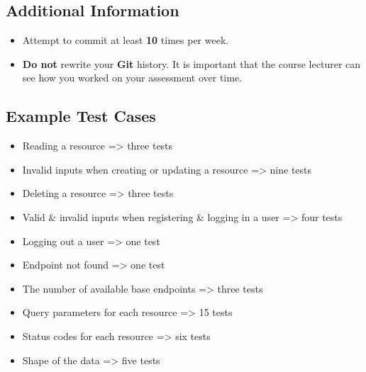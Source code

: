 \documentclass{article}
\begin{document}
\subsection*{Additional Information}
\begin{itemize}
    \item Attempt to commit at least \textbf{10} times per week.
    \item \textbf{Do not} rewrite your \textbf{Git} history. It is important that the course lecturer can see how you worked on your assessment over time. 
\end{itemize} 

\subsection*{Example Test Cases}
\begin{itemize}
  \item Reading a resource => three tests
  \item Invalid inputs when creating or updating a resource => nine tests
  \item Deleting a resource => three tests
  \item Valid \& invalid inputs when registering \& logging in a user => four tests
  \item Logging out a user => one test
  \item Endpoint not found => one test
  \item The number of available base endpoints => three tests
  \item Query parameters for each resource => 15 tests
  \item Status codes for each resource => six tests
  \item Shape of the data => five tests
\end{itemize}
\end{document}
